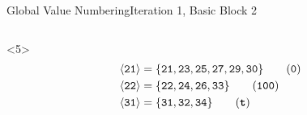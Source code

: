 \documentclass{beamer}
\newcommand{\vn}[1]{\ensuremath{\langle\texttt{#1}\rangle}}
\newcommand{\vreg}[1]{\texttt{#1}}
\begin{document}
\begin{frame}[fragile]{Global Value Numbering}{Iteration 1, Basic Block 2}
\begin{columns}[t,onlytextwidth]
\begin{column}{.5\textwidth}
\begin{onlyenv}
      \end{onlyenv}
      \begin{onlyenv}<5>
        \begin{align*}
          \vn{21} &= \{\vreg{21},
                       \vreg{23},
                       \vreg{25},
                       \vreg{27},
                       \vreg{29},
                       \vreg{30}\} \tag{\texttt{0}} \\
          \vn{22} &= \{\vreg{22},
                       \vreg{24},
                       \vreg{26},
                       \vreg{33}\} \tag{\texttt{100}} \\
          \vn{31} &= \{\vreg{31},
                       \vreg{32},
                       \vreg{34}\} \tag{\texttt{\textbf{t}}}
        \end{align*}
      \end{onlyenv}
    \end{column}
  \end{columns}
\end{frame}
\end{document}
